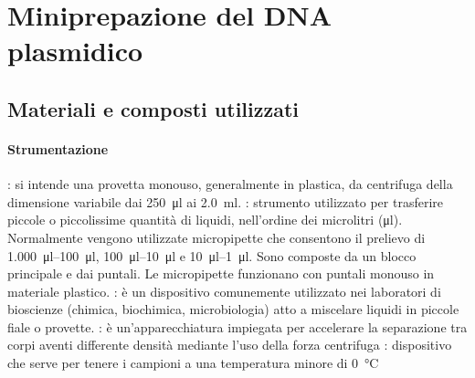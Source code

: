 \section{Miniprepazione del DNA plasmidico}\label{sec:miniprep}

\subsection{Materiali e composti utilizzati}
\paragraph{Strumentazione}
\begin{itemize}[person]
	: si intende una provetta monouso, generalmente in plastica, da centrifuga della dimensione variabile dai \qty{250}{\micro\litre} ai \qty{2.0}{\ml}.
	\itemb[Micropipette]: strumento utilizzato per trasferire piccole o piccolissime quantità di liquidi, nell'ordine dei microlitri (\unit{\micro\litre}). Normalmente vengono utilizzate micropipette che consentono il prelievo di \qtyrange{1.000}{100}{\micro\litre}, \qtyrange{100}{10}{\micro\litre} e \qtyrange{10}{1}{\micro\litre}. Sono composte da un blocco principale e dai puntali. Le micropipette funzionano con puntali monouso in materiale plastico.
	: è un dispositivo comunemente utilizzato nei laboratori di bioscienze (chimica, biochimica, microbiologia) atto a miscelare liquidi in piccole fiale o provette.
	\itemb[Centrifuga]: è un'apparecchiatura impiegata per accelerare la separazione tra corpi aventi differente densità mediante l'uso della forza centrifuga
	\itemb[Freezer]: dispositivo che serve per tenere i campioni a una temperatura minore di \qty{0}{\celsius}
\end{itemize}

